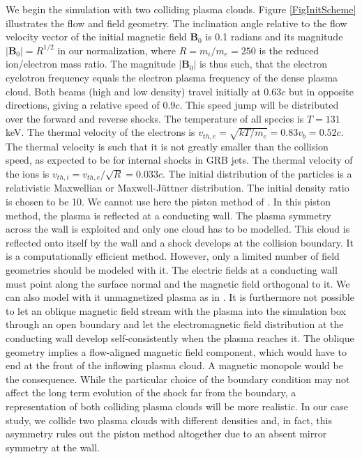 \documentclass[structabstract]{aa}
\begin{document}
We begin the simulation with two colliding plasma clouds. Figure \ref{FigInitScheme} illustrates 
the flow and field geometry. The inclination angle relative to the flow velocity vector of the 
initial magnetic field $\mathbf{B}_0$ is 0.1 radians and its magnitude $|\mathbf{B}_0| = R^{1/2}$ 
in our normalization, where $R =m_i/m_e=250$ is the reduced ion/electron mass ratio. The magnitude
$|\mathbf{B}_0|$ is thus such, that the electron cyclotron frequency equals the electron plasma
frequency of the dense plasma cloud. { Both beams (high and low density) travel initially at  $0.63c$ but in opposite directions, giving a relative speed of $0.9c$.
 } This speed jump will be distributed over the forward and reverse shocks. 
The temperature of all species is $T =131$keV. The thermal velocity of the electrons is $v_{th,e}=
\sqrt{kT/m_e} =0.83 v_b = 0.52c$. The thermal velocity is such that it is not greatly smaller than 
the collision speed, as expected to be for internal shocks in GRB jets. The thermal velocity of the 
ions is $v_{th,i} = v_{th,e}/ {\sqrt R} = 0.033c$. The initial distribution of the particles is a 
relativistic Maxwellian or Maxwell-J\"uttner distribution. The initial density ratio is chosen to 
be 10. 
{ 
We cannot use here the piston method of \citet{Forslund:1970bh}. In this 
piston method, the plasma is reflected at a conducting wall. The plasma 
symmetry across the wall is exploited and only one cloud has to be modelled. 
This cloud is reflected onto itself by the wall and a shock develops at
the collision boundary. It is a computationally efficient method. However, 
only a limited number of field geometries should be modeled with it. The 
electric fields at a conducting wall must point along the surface normal
and the magnetic field orthogonal to it. We can also model with it 
unmagnetized plasma as in \citet{Forslund:1970bh}. It is furthermore 
not possible to let an oblique magnetic field stream with the plasma into 
the simulation box through an open boundary and let the electromagnetic field 
distribution at the conducting wall develop self-consistently when the plasma
reaches it. The oblique geometry implies a flow-aligned magnetic field 
component, which would have to end at the front of the inflowing plasma 
cloud. A magnetic monopole would be the consequence. While the particular 
choice of the boundary condition may not affect the long term evolution of 
the shock far from the boundary, a representation of both colliding plasma 
clouds will be more realistic. In our case study, we collide two plasma 
clouds with different densities and, in fact, this asymmetry rules out the 
piston method altogether due to an absent mirror symmetry at the wall.} 
\end{document}
